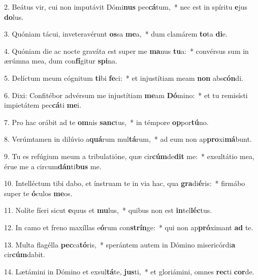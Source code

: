 2. Beátus vir, cui non imputávit Dómi\textbf{nus} pec\textbf{cá}tum,~*  nec est in spíritu \textbf{e}jus \textbf{do}lus.\

3. Quóniam tácui, inveteravérunt \textbf{os}sa \textbf{me}a,~*  dum clamárem \textbf{to}ta \textbf{di}e.\

4. Quóniam die ac nocte graváta est super me \textbf{ma}nus \textbf{tu}a:~*  convérsus sum in ærúmna mea, dum con\textbf{fí}gitur \textbf{spi}na.\

5. Delíctum meum cógnitum \textbf{ti}bi \textbf{fe}ci:~*  et injustítiam meam \textbf{non} abs\textbf{cón}di.\

6. Dixi: Confitébor advérsum me injustítiam \textbf{me}am \textbf{Dó}mino:~*  et tu remisísti impietátem pec\textbf{cá}ti \textbf{me}i.\

7. Pro hac orábit ad te \textbf{om}nis \textbf{sanc}tus,~*  in témpore \textbf{op}por\textbf{tú}no.\

8. Verúmtamen in dilúvio a\textbf{quá}rum mul\textbf{tá}rum,~*  ad eum non ap\textbf{pro}xi\textbf{má}bunt.\

9. Tu es refúgium meum a tribulatióne, quæ cir\textbf{cúm}de\textbf{dit} me:~*  exsultátio mea, érue me a circum\textbf{dán}ti\textbf{bus} me.\

10. Intelléctum tibi dabo, et ínstruam te in via hac, qua \textbf{gra}di\textbf{é}ris:~*  firmábo super te \textbf{ó}culos \textbf{me}os.\

11. Nolíte fíeri sicut \textbf{e}quus et \textbf{mu}lus,~*  quibus non est \textbf{in}tel\textbf{léc}tus.\

12. In camo et freno maxíllas e\textbf{ó}rum con\textbf{strín}ge:~*  qui non ap\textbf{pró}ximant \textbf{ad} te.\

13. Multa flagélla \textbf{pec}ca\textbf{tó}ris,~*  sperántem autem in Dómino misericórdi\textbf{a} cir\textbf{cúm}dabit.\

14. Lætámini in Dómino et exsul\textbf{tá}te, \textbf{jus}ti,~*  et gloriámini, omnes \textbf{rec}ti \textbf{cor}de.\

